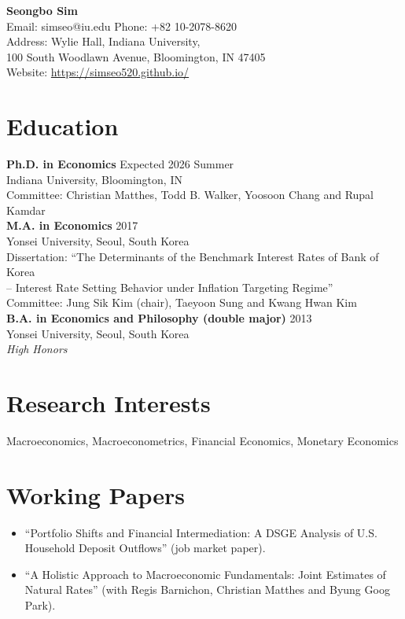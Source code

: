 \documentclass[11pt,a4paper]{article}
\begin{document}
\begin{center}
    {\LARGE \textbf{Seongbo Sim}} \\
    \vspace{2mm}
    Email: simseo@iu.edu \quad Phone: +82 10-2078-8620 \\
    Address: Wylie Hall, Indiana University, \\ 100 South Woodlawn Avenue, Bloomington, IN 47405 \\    
    Website: \hyperlink{https://simseo520.github.io/}{https://simseo520.github.io/}
\end{center}

\vspace{5mm}

\section*{Education}
\textbf{Ph.D. in Economics} \hfill Expected 2026 Summer \\
Indiana University, Bloomington, IN \\
Committee: Christian Matthes, Todd B. Walker, Yoosoon Chang and Rupal Kamdar \\

\textbf{M.A. in Economics} \hfill 2017 \\
Yonsei University, Seoul, South Korea \\
Dissertation: “The Determinants of the Benchmark Interest Rates of Bank of Korea\\
\phantom{Dissertation:} -- Interest Rate
Setting Behavior under Inflation Targeting Regime” \\
Committee: Jung Sik Kim (chair), Taeyoon Sung and Kwang Hwan Kim\\


\textbf{B.A. in Economics and Philosophy (double major)} \hfill 2013 \\
Yonsei University, Seoul, South Korea \\
\emph{High Honors}\\

\section*{Research Interests}
Macroeconomics, Macroeconometrics, Financial Economics, Monetary Economics

\section*{Working Papers} 
\begin{itemize}[leftmargin=*]
    \item ``Portfolio Shifts and Financial Intermediation: A DSGE Analysis of U.S. Household Deposit Outflows'' (job market paper).
    \item ``A Holistic Approach to Macroeconomic
        Fundamentals: Joint Estimates of
        Natural Rates'' (with Regis Barnichon, Christian Matthes and Byung Goog Park).    
\end{itemize}
\end{document}

